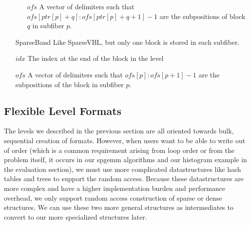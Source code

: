 \begin{enumerate}
\begin{enumerate}
        \item[$ofs$] A vector of delimiters such that $ofs[ptr[p] + q]:ofs[ptr[p] + q + 1] - 1$ are the subpositions of block $q$ in subfiber $p$.
    \end{enumerate}
\item[SparseBand]
    Like SparseVBL, but only one block is stored in each subfiber.
        \item[$idx$] The index at the end of the block in the level
        \item[$ofs$] A vector of delimiters such that $ofs[p]:ofs[p + 1] - 1$ are the subpositions of the block in subfiber $p$.
\end{enumerate}


\subsection{Flexible Level Formats}
The levels we described in the previous section are all oriented towards bulk,
sequential creation of formats. However, when users want to be able to write out
of order (which is a common requirement arising from loop order or from the
problem itself, it occurs in our spgemm algorithms and our histogram example in
the evaluation section), we must use more complicated datastructures like hash
tables and trees to support the random access. Because these datastructures are
more complex and have a higher implementation burden and performance overhead,
we only support random access construction of sparse or dense structures.  We
can use these two more general structures as intermediates to convert to our
more specialized structures later.





